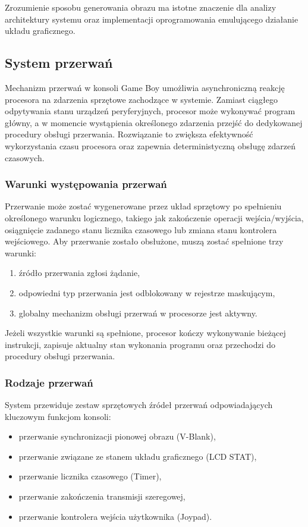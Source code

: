 \documentclass{article}
\begin{document}
Zrozumienie sposobu generowania obrazu ma istotne znaczenie dla analizy architektury systemu oraz implementacji oprogramowania emulującego działanie układu graficznego.
\subsection{System przerwań}

Mechanizm przerwań w konsoli Game Boy umożliwia asynchroniczną reakcję procesora na zdarzenia sprzętowe zachodzące w systemie. Zamiast ciągłego odpytywania stanu urządzeń peryferyjnych, procesor może wykonywać program główny, a w momencie wystąpienia określonego zdarzenia przejść do dedykowanej procedury obsługi przerwania. Rozwiązanie to zwiększa efektywność wykorzystania czasu procesora oraz zapewnia deterministyczną obsługę zdarzeń czasowych.

\subsubsection{Warunki występowania przerwań}

Przerwanie może zostać wygenerowane przez układ sprzętowy po spełnieniu określonego warunku logicznego, takiego jak zakończenie operacji wejścia/wyjścia, osiągnięcie zadanego stanu licznika czasowego lub zmiana stanu kontrolera wejściowego. Aby przerwanie zostało obsłużone, muszą zostać spełnione trzy warunki:
\begin{enumerate}
	\item źródło przerwania zgłosi żądanie,
	\item odpowiedni typ przerwania jest odblokowany w rejestrze maskującym,
	\item globalny mechanizm obsługi przerwań w procesorze jest aktywny.
\end{enumerate}

Jeżeli wszystkie warunki są spełnione, procesor kończy wykonywanie bieżącej instrukcji, zapisuje aktualny stan wykonania programu oraz przechodzi do procedury obsługi przerwania.

\subsubsection{Rodzaje przerwań}

System przewiduje zestaw sprzętowych źródeł przerwań odpowiadających kluczowym funkcjom konsoli:
\begin{itemize}
	\item przerwanie synchronizacji pionowej obrazu (V-Blank),
	\item przerwanie związane ze stanem układu graficznego (LCD STAT),
	\item przerwanie licznika czasowego (Timer),
	\item przerwanie zakończenia transmisji szeregowej,
	\item przerwanie kontrolera wejścia użytkownika (Joypad).
\end{itemize}
\end{document}
